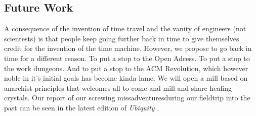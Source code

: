 \subsection{Future Work}
A consequence of the invention of time travel \cite{time-travel} and the vanity
of engineers (not scientests) \cite{sci-shirt} is that people keep going
further back in time to give themselves credit for the invention of the time
machine.
However, we propose to go back in time for a different reason.
To put a stop to the Open Adcess.
To put a stop to the work dungeons.
And to put a stop to the ACM Revolution, which however noble in it's initial
goals has become  kinda lame.
We will open a mill based on anarchist principles that welcomes all to come and
mill and share healing crystals.
Our report of our screwing missadventuresduring our fieldtrip into the past can
be seen in the latest edition of \textit{Ubiquity} \cite{future-ub}.

